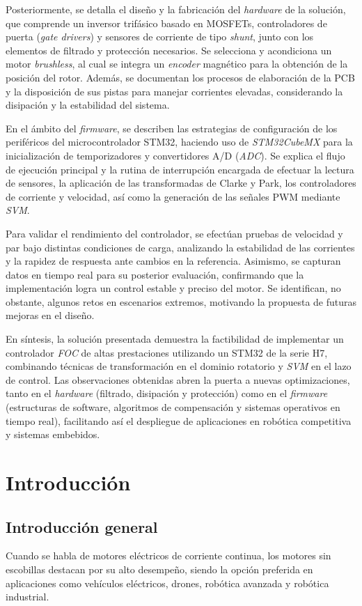\documentclass[11pt]{report}
\begin{document}
Posteriormente, se detalla el diseño y la fabricación del \emph{hardware} de la solución, que comprende un inversor trifásico basado en MOSFETs, controladores de puerta (\emph{gate drivers}) y sensores de corriente de tipo \emph{shunt}, junto con los elementos de filtrado y protección necesarios. Se selecciona y acondiciona un motor \emph{brushless}, al cual se integra un \emph{encoder} magnético para la obtención de la posición del rotor. Además, se documentan los procesos de elaboración de la PCB y la disposición de sus pistas para manejar corrientes elevadas, considerando la disipación y la estabilidad del sistema.

En el ámbito del \emph{firmware}, se describen las estrategias de configuración de los periféricos del microcontrolador STM32, haciendo uso de \emph{STM32CubeMX} para la inicialización de temporizadores y convertidores A/D (\emph{ADC}). Se explica el flujo de ejecución principal y la rutina de interrupción encargada de efectuar la lectura de sensores, la aplicación de las transformadas de Clarke y Park, los controladores de corriente y velocidad, así como la generación de las señales PWM mediante \emph{SVM}.

Para validar el rendimiento del controlador, se efectúan pruebas de velocidad y par bajo distintas condiciones de carga, analizando la estabilidad de las corrientes y la rapidez de respuesta ante cambios en la referencia. Asimismo, se capturan datos en tiempo real para su posterior evaluación, confirmando que la implementación logra un control estable y preciso del motor. Se identifican, no obstante, algunos retos en escenarios extremos, motivando la propuesta de futuras mejoras en el diseño.

En síntesis, la solución presentada demuestra la factibilidad de implementar un controlador \emph{FOC} de altas prestaciones utilizando un STM32 de la serie H7, combinando técnicas de transformación en el dominio rotatorio y \emph{SVM} en el lazo de control. Las observaciones obtenidas abren la puerta a nuevas optimizaciones, tanto en el \emph{hardware} (filtrado, disipación y protección) como en el \emph{firmware} (estructuras de software, algoritmos de compensación y sistemas operativos en tiempo real), facilitando así el despliegue de aplicaciones en robótica competitiva y sistemas embebidos.

\newpage
\chapter{Introducción}
\section{Introducción general}
Cuando se habla de motores eléctricos de corriente continua, los motores sin escobillas destacan por su alto desempeño, siendo la opción preferida en aplicaciones como vehículos eléctricos, drones, robótica avanzada y robótica industrial.
\end{document}

